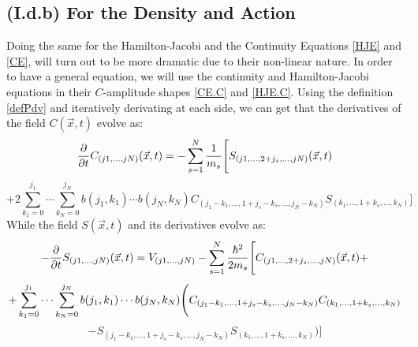 \documentclass[11pt, a4paper]{article} %
\begin{document}
\subsection*{(I.d.b) For the Density and Action}
\vspace{-0.3cm}
Doing the same for the Hamilton-Jacobi and the Continuity Equations \eqref{HJE} and \eqref{CE}, will turn out to be more dramatic due to their non-linear nature. In order to have a general equation, we will use the continuity and Hamilton-Jacobi equations in their $C$-amplitude shapes \eqref{CE.C} and \eqref{HJE.C}. Using the definition \eqref{defPdv} and iteratively derivating at each side, we can get that the derivatives of the field $C(\vec{x},t)$ evolve as:\vspace{-0.2cm}
\begin{equation}\label{infchain.CE}
\pdv{}{t}C_{(j1,...,jN)}(\vec{x},t)=-\sum_{s=1}^N\frac{1}{m_s} \Bigg[S_{(j1,...,2+j_s,...,jN)}(\vec{x},t) 
\end{equation}
$$
+2 \sum_{k_1=0}^{j_1}\cdots\sum_{k_N=0}^{j_N} b(j_1,k_1)\cdots b(j_N,k_N)C_{(j_1-k_1,...,1+j_s-k_s,...,j_N-k_N)}S_{(k_1,...,1+k_s,...,k_N)} \Bigg]
$$
While the field $S(\vec{x},t)$ and its derivatives evolve as:
\begin{equation}\label{infchain.HJE}
-\pdv{}{t}S_{(j1,...,jN)}(\vec{x},t)=V_{(j1,...,jN)}-\sum_{s=1}^N\frac{\hbar^2}{2m_s} \Bigg[ C_{(j1,...,2+j_s,...,jN)}(\vec{x},t)+\vspace{-0.1cm}
\end{equation}
$$
+\sum_{k_1=0}^{j_1}\cdots\sum_{k_N=0}^{j_N} b(j_1,k_1)\cdots b(j_N,k_N) \Bigg( C_{(j_1-k_1,...,1+j_s-k_s,...,j_N-k_N)}C_{(k_1,...,1+k_s,...,k_N)} \vspace{-0.1cm}
$$
$$
-S_{(j_1-k_1,...,1+j_s-k_s,...,j_N-k_N)}S_{(k_1,...,1+k_s,...,k_N)}  \Bigg)\Bigg]
$$
\end{document}
